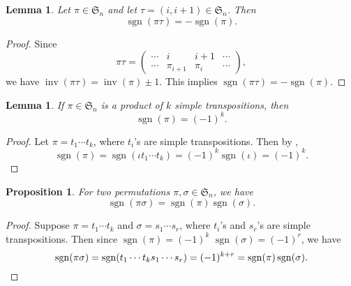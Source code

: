 \documentclass[oneside]{book}
\numberwithin{equation}{section}
\newtheorem{lem}[thm]{Lemma}
\newtheorem{prop}[thm]{Proposition}
\theoremstyle{definition}
\newcommand\inv{\operatorname{inv}}
\newcommand\sgn{\operatorname{sgn}}
\newcommand\sym{\mathfrak{S}}
\begin{document}
\begin{lem}\label{lem:inv+1}
  Let \( \pi\in \sym_n \) and let \( \tau=(i,i+1)\in\sym_n \). Then
  \[
    \sgn(\pi\tau) =  - \sgn(\pi).
  \]
\end{lem}

\begin{proof}
  Since
  \[
    \pi\tau =
    \begin{pmatrix}
      \cdots & i & i+1 & \cdots \\
      \cdots & \pi_{i+1} & \pi_i & \cdots 
    \end{pmatrix},
  \]
  we have \( \inv(\pi\tau) = \inv(\pi)\pm 1 \). This implies
  \( \sgn(\pi\tau) = - \sgn(\pi) \).
\end{proof}


\begin{lem}\label{lem:sgn=trans}
  If \( \pi\in \sym_n \) is a product of \( k \) simple transpositions, then
  \[
    \sgn(\pi) = (-1)^k.
  \]
\end{lem}
\begin{proof}
  Let \( \pi = t_1 \cdots t_k \), where \( t_i \)'s are simple
  transpositions. Then by ,
  \[
    \sgn(\pi) = \sgn(\iota t_1 \cdots t_k) = (-1)^{k}\sgn(\iota) = (-1)^{k}.
  \]
\end{proof}

\begin{prop}
    For two permutations \( \pi,\sigma\in \sym_n \), we have
  \[
    \sgn(\pi\sigma) = \sgn(\pi) \sgn(\sigma).
  \]
\end{prop}
\begin{proof}
  Suppose \( \pi = t_1 \cdots t_k \) and
  \( \sigma = s_1 \cdots s_r \), where \( t_i \)'s and \( s_r \)'s are
  simple transpositions. Then since \( \sgn(\pi) = (-1)^{k} \)
  \( \sgn(\sigma) = (-1)^{r} \), we have
  \[
    \sgn(\pi\sigma) = \sgn(t_1 \cdots t_k s_1 \cdots s_r) = (-1)^{k+r}
    = \sgn(\pi) \sgn(\sigma). \qedhere
  \]
\end{proof}
\end{document}
